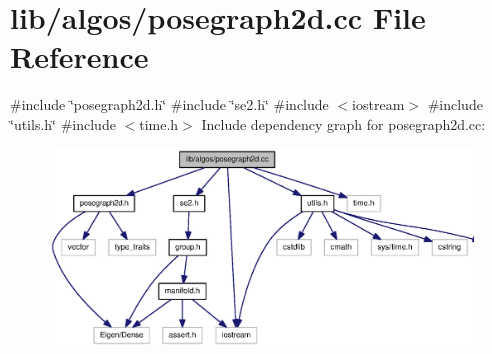 \section{lib/algos/posegraph2d.cc \-File \-Reference}
\label{posegraph2d_8cc}
{\ttfamily \#include \char`\"{}posegraph2d.\-h\char`\"{}}\*
{\ttfamily \#include \char`\"{}se2.\-h\char`\"{}}\*
{\ttfamily \#include $<$iostream$>$}\*
{\ttfamily \#include \char`\"{}utils.\-h\char`\"{}}\*
{\ttfamily \#include $<$time.\-h$>$}\*
\-Include dependency graph for posegraph2d.\-cc\-:
\nopagebreak
\begin{figure}[H]
\begin{center}
\leavevmode
\includegraphics[width=350pt]{posegraph2d_8cc__incl}
\end{center}
\end{figure}
